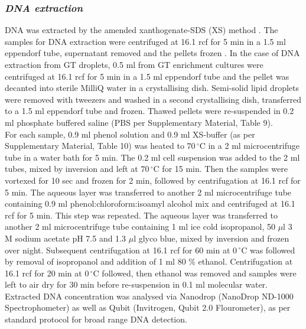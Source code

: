 \documentclass[twoside]{article}
\begin{document}
\subsubsection{\emph{DNA extraction}}
DNA was extracted by the amended xanthogenate-SDS (XS) method \cite{tillett2000xanthogenate}. The samples for DNA extraction were centrifuged at 16.1 rcf for 5 min in a 1.5 ml eppendorf tube, supernatant removed and the pellets frozen . In the case of DNA extraction from GT droplets, 0.5 ml from GT enrichment cultures were centrifuged at 16.1 rcf for 5 min in a 1.5 ml eppendorf tube and the pellet was decanted into sterile MilliQ water in a crystallising dish. Semi-solid lipid droplets were removed with tweezers and washed in a second crystallising dish, transferred to a 1.5 ml eppendorf tube and frozen. Thawed pellets were re-suspended in 0.2 ml phosphate buffered saline (PBS per Supplementary Material, Table 9).\\


For each sample, 0.9 ml phenol solution and 0.9 ml XS-buffer (as per Supplementary Material, Table 10) was  heated to $70\,^{\circ}\mathrm{C}$ in a 2 ml microcentrifuge tube in a water bath for 5 min. The 0.2 ml cell suspension was added to the 2 ml tubes, mixed by inversion and left at $70\,^{\circ}\mathrm{C}$ for 15 min. Then the samples were vortexed for 10 sec and frozen for 2 min, followed by centrifugation at 16.1 rcf for 5 min. The aqueous layer was transferred to another 2 ml microcentrifuge tube containing 0.9 ml phenol:chloroform:isoamyl alcohol mix and centrifuged at 16.1 rcf for 5 min. This step was repeated. The aqueous layer was transferred to another 2 ml microcentrifuge tube containing 1 ml ice cold isopropanol, 50 $\mu$l 3 M sodium acetate pH 7.5 and 1.3 $\mu$l glyco blue, mixed by inversion and frozen over night. Subsequent centrifugation at 16.1 rcf for 60 min at $0\,^{\circ}\mathrm{C}$ was followed by removal of isopropanol and addition of 1 ml 80 \% ethanol. Centrifugation at 16.1 rcf for 20 min at $0\,^{\circ}\mathrm{C}$ followed, then ethanol was removed and samples were left to air dry for 30 min before re-suspension in 0.1 ml molecular water.
\\ 
Extracted DNA concentration was analysed via Nanodrop (NanoDrop ND-1000 Spectrophometer) as well as Qubit (Invitrogen, Qubit 2.0 Flourometer), as per standard protocol for broad range DNA detection.
\end{document}
